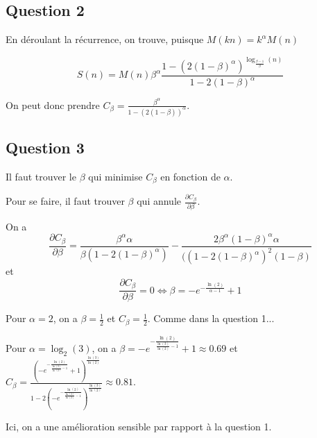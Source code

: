 \subsection*{Question 2}

En déroulant la récurrence, on trouve, puisque $M(kn) = k^\alpha M(n)$

\[
    S(n) = M(n) \beta^\alpha \frac{1-(2(1-\beta)^\alpha)^{\log_{\frac{\beta - 1}{\beta}} (n)}}{1-2(1-\beta)^\alpha}
\]

On peut donc prendre $C_\beta = \frac{\beta^\alpha}{1-(2(1-\beta))^\alpha}$.

\subsection*{Question 3}

Il faut trouver le $\beta$ qui minimise $C_\beta$ en fonction de $\alpha$.

Pour se faire, il faut trouver $\beta$ qui annule $\frac{\partial C_\beta}{\partial \beta}$.

On a 
\[
    \frac{\partial C_\beta}{\partial \beta} =  \frac{\beta^\alpha \alpha}{\beta(1-2(1-\beta)^\alpha)}-\frac{2\beta^\alpha(1-\beta)^\alpha \alpha}{((1-2(1-\beta)^\alpha)^2(1-\beta)}
\]
et
\[
    \frac{\partial C_\beta}{\partial \beta} = 0 \Leftrightarrow \beta = -e^{-\frac{\ln(2)}{\alpha-1}} +1
\]

\bigskip

Pour $\alpha =2$, on a $\beta = \frac{1}{2}$ et $C_\beta = \frac{1}{2}$. Comme dans la question 1...

Pour $\alpha = \log_2(3)$, on a $\beta = -e^{-\frac{\ln(2)}{\frac{\ln(3)}{\ln(2)}-1}}+1\approx 0.69$ et $C_\beta = \frac{\left ( -e^{-\frac{\ln(2)}{\frac{\ln(3)}{\ln(2)}-1}}+1\right)^{\frac{\ln(3)}{\ln(2)}}}{1-2\left ( -e^{-\frac{\ln(2)}{\frac{\ln(3)}{\ln(2)}-1}}\right)^{\frac{\ln(3)}{\ln(2)}}}\approx 0.81$.

Ici, on a une amélioration sensible par rapport à la question 1.


